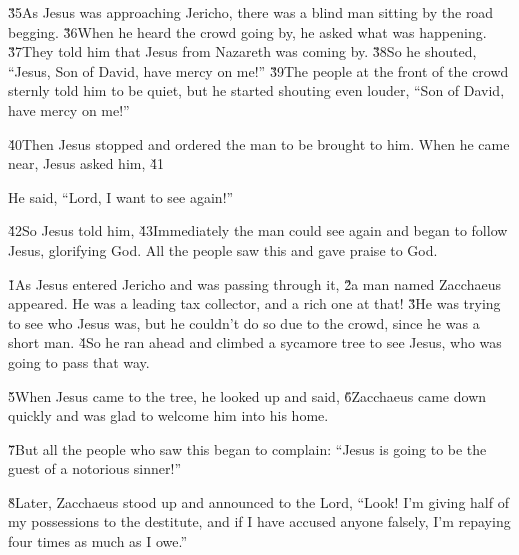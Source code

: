 \v{35}As Jesus was approaching Jericho, there was a blind man sitting by the road begging. \v{36}When he heard the crowd going by, he asked what was happening. \v{37}They told him that Jesus from Nazareth was coming by. \v{38}So he shouted, ``Jesus, Son of David, have mercy on me!'' \v{39}The people at the front of the crowd sternly told him to be quiet, but he started shouting even louder, ``Son of David, have mercy on me!''

\v{40}Then Jesus stopped and ordered the man to be brought to him. When he came near, Jesus asked him, \v{41}

He said, ``Lord, I want to see again!''

\v{42}So Jesus told him,  \v{43}Immediately the man could see again and began to follow Jesus, glorifying God. All the people saw this and gave praise to God.

\v{1}As Jesus entered Jericho and was passing through it, \v{2}a man named Zacchaeus appeared. He was a leading tax collector, and a rich one at that! \v{3}He was trying to see who Jesus was, but he couldn't do so due to the crowd, since he was a short man. \v{4}So he ran ahead and climbed a sycamore tree to see Jesus, who was going to pass that way.

\v{5}When Jesus came to the tree, he looked up and said,  \v{6}Zacchaeus came down quickly and was glad to welcome him into his home.

\v{7}But all the people who saw this began to complain: ``Jesus is going to be the guest of a notorious sinner!''

\v{8}Later, Zacchaeus stood up and announced to the Lord, ``Look! I'm giving half of my possessions to the destitute, and if I have accused anyone falsely, I'm repaying four times as much as I owe.''

